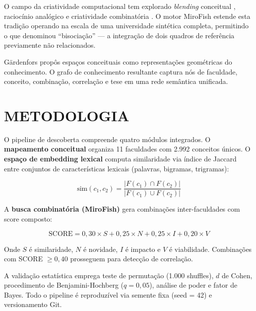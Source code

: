 \documentclass[a4paper,12pt]{article}
\begin{document}
O campo da criatividade computacional tem explorado \emph{blending} conceitual 
\cite{fauconnier2002, veale2012}, raciocínio analógico \cite{hofstadter1995, gentner1983} e 
criatividade combinatória \cite{boden2004}. O motor MiroFish estende esta tradição operando 
na escala de uma universidade sintética completa, permitindo o que  
denominou ``bisociação'' --- a integração de dois quadros de referência previamente não 
relacionados.

Gärdenfors \cite{gardenfors2000, gardenfors2014} propôs espaços conceituais como representações 
geométricas do conhecimento. O grafo de conhecimento resultante \cite{ehrlinger2016, paulheim2017} 
captura nós de faculdade, conceito, combinação, correlação e tese em uma rede semântica unificada.

\section{METODOLOGIA}\label{sec:metodologia}

O pipeline de descoberta compreende quatro módulos integrados. O \textbf{mapeamento conceitual} 
organiza 11 faculdades com 2.992 conceitos únicos. O \textbf{espaço de embedding lexical} 
computa similaridade via índice de Jaccard entre conjuntos de características lexicais 
(palavras, bigramas, trigramas):

\begin{equation}
    \text{sim}(c_1, c_2) = \frac{|F(c_1) \cap F(c_2)|}{|F(c_1) \cup F(c_2)|}
\end{equation}

A \textbf{busca combinatória (MiroFish)} gera combinações inter-faculdades com score composto:

\begin{equation}
    \text{SCORE} = 0{,}30 \times S + 0{,}25 \times N + 0{,}25 \times I + 0{,}20 \times V
\end{equation}

Onde \(S\) é similaridade, \(N\) é novidade, \(I\) é impacto e \(V\) é viabilidade. 
Combinações com SCORE $\geq 0{,}40$ prosseguem para detecção de correlação.

A validação estatística emprega teste de permutação (1.000 shuffles), \(d\) de Cohen, 
procedimento de Benjamini-Hochberg (\(q = 0{,}05\)), análise de poder e fator de Bayes. 
Todo o pipeline é reproduzível via semente fixa (seed = 42) e versionamento Git.
\end{document}
